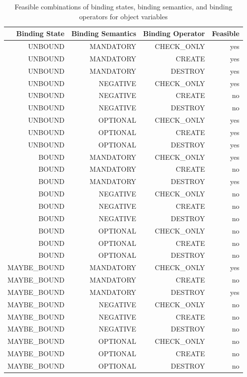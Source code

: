 \begin{table}[htbp]
  \centering
  \caption{Feasible combinations of binding states, binding semantics, and
  binding operators for object variables}
    \begin{tabular}{|r|r|r|r|}
    \hline
    \textbf{Binding State} & \textbf{Binding Semantics} & \textbf{Binding
    Operator} & \textbf{Feasible} \\
    \hline
    UNBOUND & MANDATORY & CHECK\_ONLY & yes \\
    UNBOUND & MANDATORY & CREATE & yes \\
    UNBOUND & MANDATORY & DESTROY & yes \\
    UNBOUND & NEGATIVE & CHECK\_ONLY & yes \\
    UNBOUND & NEGATIVE & CREATE & no \\
    UNBOUND & NEGATIVE & DESTROY & no \\
    UNBOUND & OPTIONAL & CHECK\_ONLY & yes \\
    UNBOUND & OPTIONAL & CREATE & yes \\
    UNBOUND & OPTIONAL & DESTROY & yes \\
    \hline
    BOUND & MANDATORY & CHECK\_ONLY & yes \\
    BOUND & MANDATORY & CREATE & no \\
    BOUND & MANDATORY & DESTROY & yes \\
    BOUND & NEGATIVE & CHECK\_ONLY & no \\
    BOUND & NEGATIVE & CREATE & no \\
    BOUND & NEGATIVE & DESTROY & no \\
    BOUND & OPTIONAL & CHECK\_ONLY & no \\
    BOUND & OPTIONAL & CREATE & no \\
    BOUND & OPTIONAL & DESTROY & no \\
    \hline
    MAYBE\_BOUND & MANDATORY & CHECK\_ONLY & yes \\
    MAYBE\_BOUND & MANDATORY & CREATE & no \\
    MAYBE\_BOUND & MANDATORY & DESTROY & yes \\
    MAYBE\_BOUND & NEGATIVE & CHECK\_ONLY & no \\
    MAYBE\_BOUND & NEGATIVE & CREATE & no \\
    MAYBE\_BOUND & NEGATIVE & DESTROY & no \\
    MAYBE\_BOUND & OPTIONAL & CHECK\_ONLY & no \\
    MAYBE\_BOUND & OPTIONAL & CREATE & no \\
    MAYBE\_BOUND & OPTIONAL & DESTROY & no \\
    \hline
    \end{tabular}%
  \label{tab:bindingCombinations}%
\end{table}%

